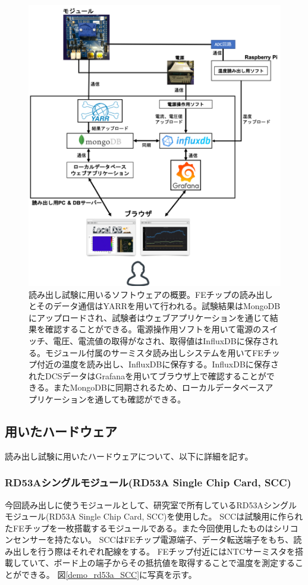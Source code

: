 \begin{figure}[bpt]\centering
\includegraphics[width=14cm]{./readout_SW_overview.png}
\caption[読み出し試験に用いるソフトウェアの概要]{読み出し試験に用いるソフトウェアの概要。FEチップの読み出しとそのデータ通信はYARRを用いて行われる。試験結果はMongoDBにアップロードされ、試験者はウェブアプリケーションを通じて結果を確認することができる。電源操作用ソフトを用いて電源のスイッチ、電圧、電流値の取得がなされ、取得値はInfluxDBに保存される。モジュール付属のサーミスタ読み出しシステムを用いてFEチップ付近の温度を読み出し、InfluxDBに保存する。InfluxDBに保存されたDCSデータはGrafanaを用いてブラウザ上で確認することができる。またMongoDBに同期されるため、ローカルデータベースアプリケーションを通しても確認ができる。}
\label{readout_SW_overview}
\end{figure}

\clearpage
\subsection{用いたハードウェア}
読み出し試験に用いたハードウェアについて、以下に詳細を記す。

\subsubsection{RD53Aシングルモジュール(RD53A Single Chip Card, SCC)\cite{5-10}}
今回読み出しに使うモジュールとして、研究室で所有しているRD53Aシングルモジュール(RD53A Single Chip Card, SCC)を使用した。
SCCは試験用に作られたFEチップを一枚搭載するモジュールである。また今回使用したものはシリコンセンサーを持たない。
SCCはFEチップ電源端子、データ転送端子をもち、読み出しを行う際はそれぞれ配線をする。
FEチップ付近にはNTCサーミスタを搭載していて、ボード上の端子からその抵抗値を取得することで温度を測定することができる。
図\ref{demo_rd53a_SCC}に写真を示す。

